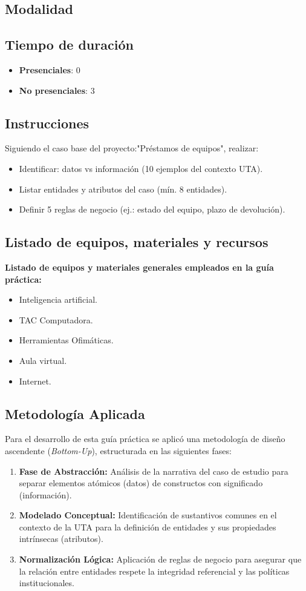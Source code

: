 \documentclass{article}
\begin{document}
\subsection{Modalidad}

\subsection{Tiempo de duración}
\begin{itemize}
    \item \textbf{Presenciales}: 0
    \item \textbf{No presenciales}: 3
\end{itemize}
\subsection{Instrucciones}
Siguiendo el caso base del proyecto:"Préstamos de equipos", realizar:
\begin{itemize}
    \item Identificar: datos vs información (10 ejemplos del contexto UTA).
    \item Listar entidades y atributos del caso (mín. 8 entidades).
    \item Definir 5 reglas de negocio (ej.: estado del equipo, plazo de devolución).
\end{itemize}
\subsection{Listado de equipos, materiales y recursos}
\textbf{Listado de equipos y materiales generales empleados en la guía práctica:}
\begin{itemize}
    \item  Inteligencia artificial.
    \item TAC Computadora.
    \item Herramientas Ofimáticas.
    \item Aula virtual.
    \item Internet. 
\end{itemize}

\subsection{Metodología Aplicada}
Para el desarrollo de esta guía práctica se aplicó una metodología de diseño ascendente (\textit{Bottom-Up}), estructurada en las siguientes fases:
\begin{enumerate}[label=\alph*)]
    \item \textbf{Fase de Abstracción:} Análisis de la narrativa del caso de estudio para separar elementos atómicos (datos) de constructos con significado (información).
    \item \textbf{Modelado Conceptual:} Identificación de sustantivos comunes en el contexto de la UTA para la definición de entidades y sus propiedades intrínsecas (atributos).
    \item \textbf{Normalización Lógica:} Aplicación de reglas de negocio para asegurar que la relación entre entidades respete la integridad referencial y las políticas institucionales.
\end{enumerate}
\end{document}
